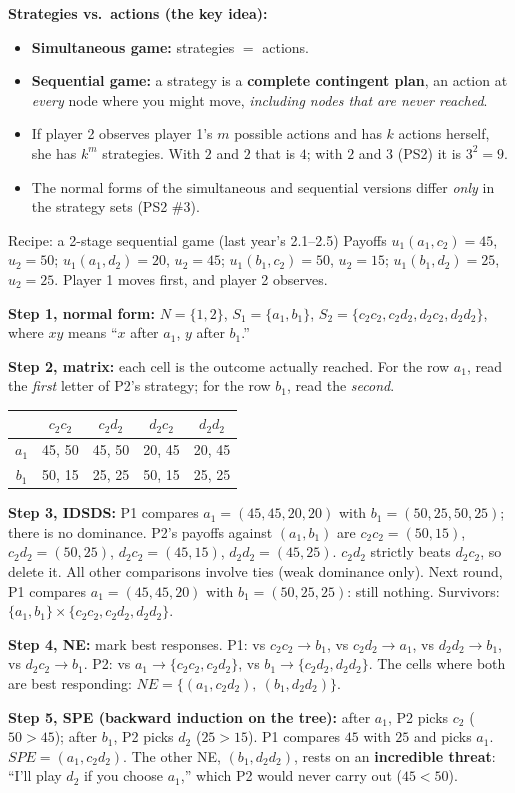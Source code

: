 \documentclass[11pt]{article}
\begin{document}
\textbf{Strategies vs.\ actions (the key idea):}
\begin{itemize}
\item \textbf{Simultaneous game:} strategies $=$ actions.
\item \textbf{Sequential game:} a strategy is a \textbf{complete contingent plan}, an action at \emph{every} node where you might move, \emph{including nodes that are never reached}.
\item If player 2 observes player 1's $m$ possible actions and has $k$ actions herself, she has $k^m$ strategies. With $2$ and $2$ that is $4$; with $2$ and $3$ (PS2) it is $3^2=9$.
\item The normal forms of the simultaneous and sequential versions differ \emph{only} in the strategy sets (PS2 \#3).
\end{itemize}

\begin{workbox}{Recipe: a 2-stage sequential game (last year's 2.1--2.5)}
Payoffs $u_1(a_1,c_2)=45$, $u_2=50$; $u_1(a_1,d_2)=20$, $u_2=45$; $u_1(b_1,c_2)=50$, $u_2=15$; $u_1(b_1,d_2)=25$, $u_2=25$. Player 1 moves first, and player 2 observes.

\textbf{Step 1, normal form:} $N=\{1,2\}$, $S_1=\{a_1,b_1\}$, $S_2=\{c_2c_2,c_2d_2,d_2c_2,d_2d_2\}$, where $xy$ means ``$x$ after $a_1$, $y$ after $b_1$.''

\textbf{Step 2, matrix:} each cell is the outcome actually reached. For the row $a_1$, read the \emph{first} letter of P2's strategy; for the row $b_1$, read the \emph{second}.
\begin{center}
\begin{tabular}{c|cccc}
 & $c_2c_2$ & $c_2d_2$ & $d_2c_2$ & $d_2d_2$\\\hline
$a_1$ & 45, 50 & 45, 50 & 20, 45 & 20, 45\\
$b_1$ & 50, 15 & 25, 25 & 50, 15 & 25, 25
\end{tabular}
\end{center}

\textbf{Step 3, IDSDS:} P1 compares $a_1=(45,45,20,20)$ with $b_1=(50,25,50,25)$; there is no dominance. P2's payoffs against $(a_1,b_1)$ are $c_2c_2=(50,15)$, $c_2d_2=(50,25)$, $d_2c_2=(45,15)$, $d_2d_2=(45,25)$. $c_2d_2$ strictly beats $d_2c_2$, so delete it. All other comparisons involve ties (weak dominance only). Next round, P1 compares $a_1=(45,45,20)$ with $b_1=(50,25,25)$: still nothing. Survivors: $\{a_1,b_1\}\times\{c_2c_2,c_2d_2,d_2d_2\}$.

\textbf{Step 4, NE:} mark best responses. P1: vs $c_2c_2\to b_1$, vs $c_2d_2\to a_1$, vs $d_2d_2\to b_1$, vs $d_2c_2\to b_1$. P2: vs $a_1\to\{c_2c_2,c_2d_2\}$, vs $b_1\to\{c_2d_2,d_2d_2\}$. The cells where both are best responding: $NE=\{(a_1,c_2d_2),\ (b_1,d_2d_2)\}$.

\textbf{Step 5, SPE (backward induction on the tree):} after $a_1$, P2 picks $c_2$ ($50>45$); after $b_1$, P2 picks $d_2$ ($25>15$). P1 compares $45$ with $25$ and picks $a_1$. $SPE=(a_1,c_2d_2)$. The other NE, $(b_1,d_2d_2)$, rests on an \textbf{incredible threat}: ``I'll play $d_2$ if you choose $a_1$,'' which P2 would never carry out ($45<50$).
\end{workbox}
\end{document}
